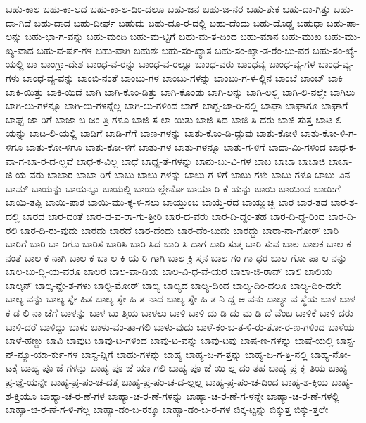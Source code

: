 {ಬಹು-ಕಾಲ
ಬಹು-ಕಾ-ಲದ
ಬಹು-ಕಾ-ಲ-ದಿಂ-ದಲೂ
ಬಹು-ಜನ
ಬಹು-ಜ-ನರ
ಬಹು-ತೇಕ
ಬಹು-ದಾ-ಗಿತ್ತು
ಬಹು-ದಾ-ಗಿದೆ
ಬಹು-ದಾದ
ಬಹು-ದೀರ್ಘ
ಬಹುದು
ಬಹು-ದೂ-ರ-ದಲ್ಲಿ
ಬಹು-ದೆಂದು
ಬಹು-ದೊಡ್ಡ
ಬಹುಧಾ
ಬಹು-ಪಾ-ಲನ್ನು
ಬಹು-ಭಾ-ಗ-ವನ್ನು
ಬಹು-ಮಂದಿ
ಬಹು-ಮ-ಟ್ಟಿಗೆ
ಬಹು-ಮ-ತ-ದಿಂದ
ಬಹು-ಮಾನ
ಬಹು-ಮುಖ
ಬಹು-ಮು-ಖ್ಯ-ವಾದ
ಬಹು-ವ-ರ್ಷ-ಗಳ
ಬಹು-ವಾಗಿ
ಬಹುಶಃ
ಬಹು-ಸಂ-ಖ್ಯಾತ
ಬಹು-ಸಂ-ಖ್ಯಾ-ತ-ರೆಂ-ಬು-ವರ
ಬಹು-ಸಂ-ಖ್ಯೆ-ಯಲ್ಲಿ
ಬಾ
ಬಾಂಗ್ಲಾ-ದೇಶ
ಬಾಂಧ-ವ-ರನ್ನು
ಬಾಂಧ-ವ-ರಲ್ಲೂ
ಬಾಂಧ-ವರು
ಬಾಂಧವ್ಯ
ಬಾಂಧ-ವ್ಯ-ಗಳ
ಬಾಂಧ-ವ್ಯ-ಗಳು
ಬಾಂಧ-ವ್ಯ-ವನ್ನು
ಬಾಂಬಿ-ನಂತೆ
ಬಾಂಬು-ಗಳ
ಬಾಂಬು-ಗಳನ್ನು
ಬಾಂಬು-ಗ-ಳ-ಲ್ಲಿನ
ಬಾಂಬೆ
ಬಾಂಬ್
ಬಾಕಿ
ಬಾಕಿ-ಯಿತ್ತು
ಬಾಕಿ-ಯಿದೆ
ಬಾಗಿ
ಬಾಗಿ-ಕೊಂ-ಡಿತ್ತು
ಬಾಗಿ-ಕೊಂಡು
ಬಾಗಿ-ಲನ್ನು
ಬಾಗಿ-ಲಲ್ಲಿ
ಬಾಗಿ-ಲಿ-ನಲ್ಲೇ
ಬಾಗಿಲು
ಬಾಗಿ-ಲು-ಗಳನ್ನೂ
ಬಾಗಿ-ಲು-ಗಳನ್ನೆಲ್ಲ
ಬಾಗಿ-ಲು-ಗಳಿಂದ
ಬಾಗ್
ಬಾಗ್ಬ-ಜಾ-ರಿ-ನಲ್ಲಿ
ಬಾಘಾ
ಬಾಘಾಗೂ
ಬಾಘಾಗೆ
ಬಾಘ್ಬ-ಜಾ-ರಿಗೆ
ಬಾಜಾ-ಬ-ಜಂ-ತ್ರಿ-ಗಳೂ
ಬಾಜಿ-ಸ-ಲಾ-ಯಿತು
ಬಾಜಿ-ಸಿದ
ಬಾಜಿ-ಸಿ-ದರು
ಬಾಜಿ-ಸುತ್ತ
ಬಾಟ-ಲಿ-ಯನ್ನು
ಬಾಟ-ಲಿ-ಯಲ್ಲಿ
ಬಾಡಿಗೆ
ಬಾಡಿ-ಗೆಗೆ
ಬಾಣ-ಗಳನ್ನು
ಬಾತು-ಕೊಂ-ಡಿ-ದ್ದುವು
ಬಾತು-ಕೋಳಿ
ಬಾತು-ಕೋ-ಳಿ-ಗ-ಳಿಗೂ
ಬಾತು-ಕೋ-ಳಿಗೂ
ಬಾತು-ಕೋ-ಳಿಗೆ
ಬಾತು-ಗಳ
ಬಾತು-ಗಳನ್ನೂ
ಬಾತು-ಗ-ಳಿಗೆ
ಬಾದಾ-ಮಿ-ಗಳಿಂದ
ಬಾಧ-ಕ-ವಾ-ಗ-ಬಾ-ರ-ದ-ಲ್ಲವೆ
ಬಾಧ-ಕ-ವಿಲ್ಲ
ಬಾಧೆ
ಬಾಧ್ಯ-ತೆ-ಗಳನ್ನು
ಬಾನು-ಬು-ವಿ-ಗಳ
ಬಾಬ
ಬಾಬಾ
ಬಾಬಾಜಿ
ಬಾಬಾ-ಜಿ-ಯ-ವರು
ಬಾಬಾರ
ಬಾಬಾ-ರಿಗೆ
ಬಾಬು
ಬಾಬು-ಗಳನ್ನು
ಬಾಬು-ಗ-ಳಿಗೆ
ಬಾಬು-ಗಳು
ಬಾಬು-ಗಳೂ
ಬಾಬು-ವಿನ
ಬಾಮ್
ಬಾಯನ್ನು
ಬಾಯನ್ನೂ
ಬಾಯಲ್ಲಿ
ಬಾಯ-ಲ್ಲೇನೋ
ಬಾಯಾ-ರಿ-ಕೆ-ಯನ್ನು
ಬಾಯಿ
ಬಾಯಿಂದ
ಬಾಯಿಗೆ
ಬಾಯಿ-ತಪ್ಪಿ
ಬಾಯಿ-ಪಾಠ
ಬಾಯಿ-ಮು-ಕ್ಕ-ಳಿ-ಸಲು
ಬಾಯ್ತುಂಬ
ಬಾಯ್ತೆ-ರೆದ
ಬಾಯ್ಮುಚ್ಚಿ
ಬಾರ
ಬಾರ-ತದ
ಬಾರ-ತ-ದಲ್ಲಿ
ಬಾರದ
ಬಾರ-ದಂತೆ
ಬಾರ-ದ-ವ-ರಾ-ಗು-ತ್ತೀರಿ
ಬಾರ-ದ-ವರು
ಬಾರ-ದಿ-ದ್ದಂ-ತಹ
ಬಾರ-ದಿ-ದ್ದ-ರಿಂದ
ಬಾರ-ದಿ-ರಲಿ
ಬಾರ-ದಿ-ರು-ವುದು
ಬಾರದು
ಬಾರದೆ
ಬಾರ-ದೆಂದು
ಬಾರ-ದೆಂ-ಬುದು
ಬಾರದ್ದು
ಬಾರಾ-ನಾ-ಗೋರ್
ಬಾರಿ
ಬಾರಿಗೆ
ಬಾರಿ-ಬಾ-ರಿಗೂ
ಬಾರಿಸ
ಬಾರಿಸಿ
ಬಾರಿ-ಸಿದ
ಬಾರಿ-ಸಿ-ದಾಗ
ಬಾರಿ-ಸುತ್ತ
ಬಾರಿ-ಸುವ
ಬಾಲ
ಬಾಲಕ
ಬಾಲ-ಕ-ನಂತೆ
ಬಾಲ-ಕ-ನಾಗಿ
ಬಾಲ-ಕ-ಬಾ-ಲ-ಕಿ-ಯ-ರಿ-ಗಾಗಿ
ಬಾಲ-ಕ್ರಿ-ಸ್ತನ
ಬಾಲ-ಗಂ-ಗಾ-ಧರ
ಬಾಲ-ಗೋ-ಪಾ-ಲ-ನನ್ನು
ಬಾಲ-ಬು-ದ್ಧಿ-ಯ-ವರೂ
ಬಾಲರ
ಬಾಲ-ವಾ-ಡಿಯ
ಬಾಲ-ವಿ-ಧ-ವೆ-ಯರ
ಬಾಲಾ-ಜಿ-ರಾವ್
ಬಾಲಿ
ಬಾಲಿಯ
ಬಾಲ್ಕನ್
ಬಾಲ್ಕ-ನ್ದೇ-ಶ-ಗಳು
ಬಾಲ್ಟಿ-ಮೋರ್
ಬಾಲ್ಯ
ಬಾಲ್ಯದ
ಬಾಲ್ಯ-ದಿಂದ
ಬಾಲ್ಯ-ದಿಂ-ದಲೂ
ಬಾಲ್ಯ-ದಿಂ-ದಲೇ
ಬಾಲ್ಯ-ವನ್ನು
ಬಾಲ್ಯ-ಸ್ನೇ-ಹಿತ
ಬಾಲ್ಯ-ಸ್ನೇ-ಹಿ-ತ-ನಾದ
ಬಾಲ್ಯ-ಸ್ನೇ-ಹಿ-ತ-ನಿ-ದ್ದ-ಅ-ವನು
ಬಾಲ್ಯಾ-ವ-ಸ್ಥೆಯ
ಬಾಳ
ಬಾಳ-ಕ-ಡ-ಲಿ-ನಾ-ಚೆಗೆ
ಬಾಳನ್ನು
ಬಾಳ-ಬು-ತ್ತಿಯ
ಬಾಳಲು
ಬಾಳಿ
ಬಾಳಿ-ದು-ಡಿ-ದು-ಮ-ಡಿ-ದೆ-ವೆಂಬ
ಬಾಳಿಕೆ
ಬಾಳಿ-ದರು
ಬಾಳಿ-ದರೆ
ಬಾಳಿದ್ದು
ಬಾಳು
ಬಾಳು-ವಂ-ತಾ-ಗಲಿ
ಬಾಳು-ವುದು
ಬಾಳೆ-ಕಂ-ಬ-ತ-ಳಿ-ರು-ತೋ-ರ-ಣ-ಗಳಿಂದ
ಬಾಳೆಯ
ಬಾಳೆ-ಹಣ್ಣು
ಬಾವಿ
ಬಾವುಟ
ಬಾವು-ಟ-ಗಳಿಂದ
ಬಾವು-ಟ-ವನ್ನು
ಬಾವು-ಟವು
ಬಾಷ-ಣ-ಗಳನ್ನು
ಬಾಷೆ-ಯಲ್ಲಿ
ಬಾಸ್ಟ-ನ್-ನ್ಯೂ-ಯಾ-ರ್ಕು-ಗಳ
ಬಾಸ್ಟ-ನ್ನಿಗೆ
ಬಾಹು-ಗಳನ್ನು
ಬಾಹ್ಯ
ಬಾಹ್ಯ-ಜ-ಗ-ತ್ತನ್ನು
ಬಾಹ್ಯ-ಜ-ಗ-ತ್ತಿ-ನಲ್ಲಿ
ಬಾಹ್ಯ-ನೋ-ಟಕ್ಕೆ
ಬಾಹ್ಯ-ಪೂ-ಜೆ-ಗಳನ್ನು
ಬಾಹ್ಯ-ಪೂ-ಜೆ-ಯಾ-ಗಲಿ
ಬಾಹ್ಯ-ಪೂ-ಜೆ-ಯಿ-ಲ್ಲ-ದಂ-ತಹ
ಬಾಹ್ಯ-ಪ್ರ-ಕೃ-ತಿಯ
ಬಾಹ್ಯ-ಪ್ರ-ಜ್ಞೆ-ಯನ್ನೇ
ಬಾಹ್ಯ-ಪ್ರ-ಪಂ-ಚ-ದತ್ತ
ಬಾಹ್ಯ-ಪ್ರ-ಪಂ-ಚ-ದ-ಲ್ಲಲ್ಲ
ಬಾಹ್ಯ-ಪ್ರ-ಪಂ-ಚ-ದಿಂದ
ಬಾಹ್ಯ-ಶ-ಕ್ತಿಯ
ಬಾಹ್ಯ-ಶ-ಕ್ತಿಯೂ
ಬಾಹ್ಯಾ-ಚ-ರ-ಣೆ-ಗಳ
ಬಾಹ್ಯಾ-ಚ-ರ-ಣೆ-ಗಳನ್ನು
ಬಾಹ್ಯಾ-ಚ-ರ-ಣೆ-ಗ-ಳನ್ನೇ
ಬಾಹ್ಯಾ-ಚ-ರ-ಣೆ-ಗಳಲ್ಲಿ
ಬಾಹ್ಯಾ-ಚ-ರ-ಣೆ-ಗ-ಳಿ-ಗೆಲ್ಲ
ಬಾಹ್ಯಾ-ಡಂ-ಬ-ರಕ್ಕೂ
ಬಾಹ್ಯಾ-ಡಂ-ಬ-ರ-ಗಳ
ಬಿಕ್ಕ-ಟ್ಟನ್ನು
ಬಿಕ್ಕುತ್ತ
ಬಿಕ್ಕು-ತ್ತಲೇ
}
